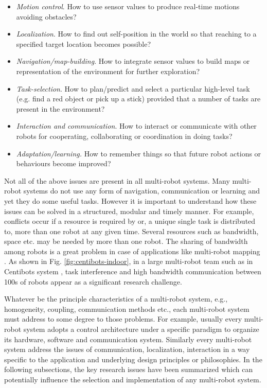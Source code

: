 \begin{itemize}
\item {\em Motion control}. How to use sensor values to produce real-time motions avoiding obstacles?
\item {\em Localization}. How to find out self-position in the world so that reaching to a specified target location becomes possible?
\item {\em Navigation/map-building}. How to integrate sensor values to build maps or representation of the environment for further exploration?
\item {\em Task-selection}. How to plan/predict and select a particular high-level task (e.g. find a red object or pick up a stick) provided that a number of tasks are present in the environment? 
\item {\em Interaction and communication}. How to interact or communicate with other robots for cooperating, collaborating or coordination in doing tasks?
\item {\em Adaptation/learning.} How to remember things so that future robot actions or behaviours become improved?
\end{itemize}
Not all of the above issues are present in all multi-robot systems. Many multi-robot systems do not use any form of navigation, communication or learning and yet they do some useful tasks. However it is important to understand how these issues can be solved in a structured, modular and timely manner. For example, conflicts occur if a resource is required by or, a unique single task is distributed to, more than one robot at any given time. Several resources such as bandwidth, space etc. may be needed by more than one robot. The sharing of bandwidth among robots is a great problem in case of applications like multi-robot mapping \cite{Konolige+2003}. As shown in Fig. \ref{fig:centibots-indoor}, in a large multi-robot team such as in Centibots system \cite{Ortiz+2005}, task interference and high bandwidth communication between 100s of robots appear as a significant research challenge.

Whatever be the principle characteristics of a multi-robot system, e.g., homogeneity, coupling, communication methods etc., each multi-robot system must address to some degree to those problems. For example, usually every multi-robot system adopts a control architecture under a specific paradigm to organize its hardware, software and communication system. Similarly every multi-robot system address the issues of communication, localization, interaction in a way specific to the application and underlying design principles or philosophies. In the following subsections,  the key research issues have been summarized which can potentially influence the selection and implementation of any multi-robot system.
